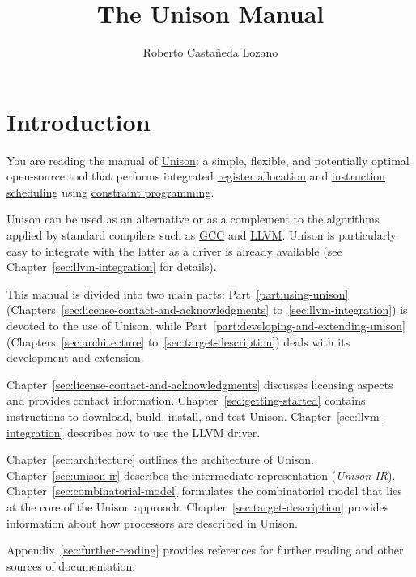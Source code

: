 \documentclass[11pt]{report}
\title{The Unison Manual}
\author{Roberto Castañeda Lozano}
\date{}
\begin{document}
\maketitle

\setcounter{tocdepth}{2}
\tableofcontents

\chapter*{Introduction}

You are reading the manual of \href{http://unison-code.github.io/}{Unison}: a
simple, flexible, and potentially optimal open-source tool that performs
integrated \href{https://en.wikipedia.org/wiki/Register_allocation}{register
  allocation} and
\href{https://en.wikipedia.org/wiki/Instruction_scheduling}{instruction
  scheduling} using
\href{https://en.wikipedia.org/wiki/Constraint_programming}{constraint
  programming}.

Unison can be used as an alternative or as a complement to the algorithms
applied by standard compilers such as \href{https://gcc.gnu.org/}{GCC} and
\href{http://llvm.org/}{LLVM}.
%
Unison is particularly easy to integrate with the latter as a driver is already
available (see Chapter~\ref{sec:llvm-integration} for details).

This manual is divided into two main parts: Part~\ref{part:using-unison}
(Chapters~\ref{sec:license-contact-and-acknowledgments}
to~\ref{sec:llvm-integration}) is devoted to the use of Unison, while
Part~\ref{part:developing-and-extending-unison} (Chapters~\ref{sec:architecture}
to~\ref{sec:target-description}) deals with its development and extension.

Chapter~\ref{sec:license-contact-and-acknowledgments} discusses licensing
aspects and provides contact information.
%
Chapter~\ref{sec:getting-started} contains instructions to download, build,
install, and test Unison.
%
Chapter~\ref{sec:llvm-integration} describes how to use the LLVM driver.

Chapter~\ref{sec:architecture} outlines the architecture of Unison.
%
Chapter~\ref{sec:unison-ir} describes the intermediate representation
(\emph{Unison IR}).
%
Chapter~\ref{sec:combinatorial-model} formulates the combinatorial model that
lies at the core of the Unison approach.
%
Chapter~\ref{sec:target-description} provides information about how processors
are described in Unison.

Appendix~\ref{sec:further-reading} provides references for further reading and
other sources of documentation.
\end{document}
